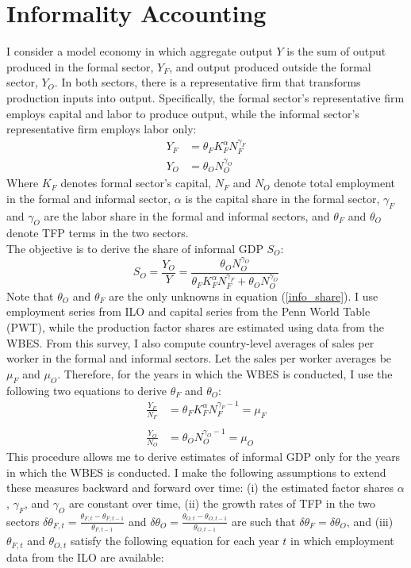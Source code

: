 \documentclass[letterpaper, 12pt]{article}
\begin{document}
\section{Informality Accounting}\label{sec_model}
I consider a model economy in which aggregate output $Y$ is the sum of output produced in the formal sector, $Y_F$, and output produced outside the formal sector, $Y_O$. In both sectors, there is a representative firm that transforms production inputs into output. Specifically, the formal sector's representative firm employs capital and labor to produce output, while the informal sector's representative firm employs labor only:
\begin{align}
    Y_F&=\theta_F K_F^{\alpha}N_F^{\gamma_F}\nonumber\\
    Y_O&=\theta_O N_O^{\gamma_O}\nonumber
\end{align}
Where $K_F$ denotes formal sector's capital, $N_F$ and $N_O$ denote total employment in the formal and informal sector, $\alpha$ is the capital share in the formal sector, $\gamma_F$ and $\gamma_O$ are the labor share in the formal and informal sectors, and $\theta_F$ and $\theta_O$ denote TFP terms in the two sectors.
\\The objective is to derive the share of informal GDP $S_O$:
\begin{equation}
    S_O=\frac{Y_O}{Y}=\frac{\theta_O N_O^{\gamma_O}}{\theta_F K_F^{\alpha}N_F^{\gamma_F}+\theta_O N_O^{\gamma_O}}\label{info_share}
\end{equation}
\noindent
Note that $\theta_O$ and $\theta_F$ are the only unknowns in equation (\ref{info_share}). I use employment series from ILO and capital series from the Penn World Table (PWT), while the production factor shares are estimated using data from the WBES. From this survey, I also compute country-level averages of sales per worker in the formal and informal sectors. Let the sales per worker averages be $\mu_F$ and $\mu_O$. Therefore, for the years in which the WBES is conducted, I use the following two equations to derive $\theta_F$ and $\theta_O$:
\begin{align}
    \frac{Y_F}{N_F}&=\theta_F K_F^{\alpha}N_F^{\gamma_F-1}=\mu_F\label{vapw_form}\\
    \nonumber\\
    \frac{Y_O}{N_O}&=\theta_O N_O^{\gamma_O-1} = \mu_O\label{vapw_info}
\end{align}
This procedure allows me to derive estimates of informal GDP only for the years in which the WBES is conducted. I make the following assumptions to extend these measures backward and forward over time: (i) the estimated factor shares $\alpha$, $\gamma_F$, and $\gamma_O$ are constant over time, (ii) the growth rates of TFP in the two sectors $\delta\theta_{F,t} = \frac{\theta_{F,t}-\theta_{F,t-1}}{\theta_{F,t-1}}$ and $\delta\theta_O=\frac{\theta_{O,t}-\theta_{O,t-1}}{\theta_{O,t-1}}$ are such that $\delta\theta_F=\delta\theta_O$, and (iii) $\theta_{F,t}$ and $\theta_{O,t}$  satisfy the following equation for each year $t$ in which employment data from the ILO are available:
\end{document}
